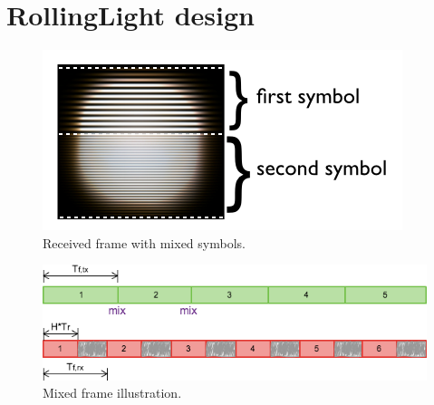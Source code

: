\section{RollingLight design}


\begin{figure}[!t]
  \centering
  \includegraphics[scale=0.4]{pic/mixed_frame.png}
  \caption{Received frame with mixed symbols.}
  \label{fig:mix_photo}
\end{figure}

\begin{figure}[!t]
  \centering
  \includegraphics[scale=0.35]{fig/mix2.png}
  \caption{Mixed frame illustration.}
  \label{fig:mix2}
\end{figure}

